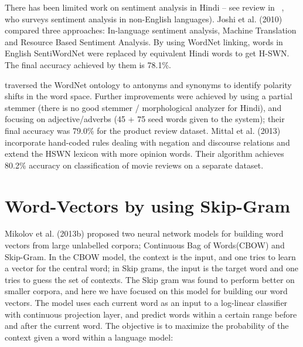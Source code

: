 \def\DevnagVersion{2.15}\documentclass[11pt]{article}
\begin{document}
There has been limited work on sentiment analysis in Hindi -- see review in
~\cite{Medagoda:13}, who surveys sentiment analysis in non-English languages). Joshi et al. (2010) compared three approaches: In-language sentiment
analysis, Machine Translation and Resource Based Sentiment Analysis. By using WordNet linking, words in English SentiWordNet were replaced by equivalent Hindi words to get H-SWN. The final accuracy achieved by them is 78.1\%.


\cite{Bakliwal:12}
traversed the WordNet ontology to antonyms and synonyms 
to identify polarity shifts in the word space. Further
improvements were achieved by using a partial stemmer (there is no good
stemmer / morphological analyzer for Hindi), and focusing on 
adjective/adverbs (45 + 75 seed words given to the system); their 
final accuracy was 79.0\% for the product review dataset. 
Mittal et al. (2013) incorporate hand-coded
rules dealing with negation and discourse relations and extend the
HSWN lexicon with more opinion words.  Their algorithm achieves  80.2\%
accuracy on classification of movie reviews on a separate dataset.\\

\section{Word-Vectors by using Skip-Gram}
Mikolov et al. (2013b) proposed two neural network models for building word
vectors from large unlabelled corpora; Continuous Bag of Words(CBOW) and
Skip-Gram.  In the 
CBOW model, the context is the input, and one tries to learn a vector
for the central word; in Skip grams, the 
input is the target word and one tries to guess the set of
contexts.  The Skip gram was found to 
perform better on smaller corpora, and
here we have focused on this model for building our word vectors. 
The model uses each current word as an input to a log-linear
classifier with continuous projection layer, and predict words within a
certain range before and after the current word. The objective is to maximize
the probability of the context given a word within a language model:
\end{document}
